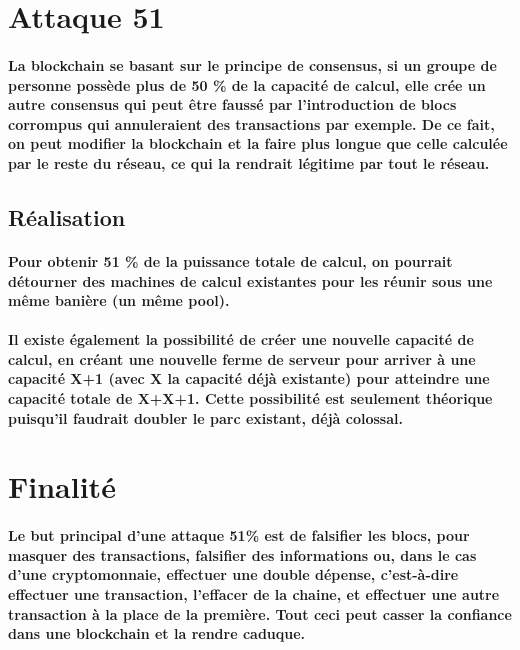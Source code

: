 \documentclass[12pt, a4paper, oneside]{book}
\begin{document}
    \section{Attaque 51}
    \paragraph{La blockchain se basant sur le principe de consensus, si un groupe de personne possède plus de 50 \% de la capacité de calcul, elle crée un autre consensus qui peut être faussé par l'introduction de blocs corrompus qui annuleraient des transactions par exemple. De ce fait, on peut modifier la blockchain et la faire plus longue que celle calculée par le reste du réseau, ce qui la rendrait légitime par tout le réseau.}
    \subsection{Réalisation}
    \paragraph{Pour obtenir 51 \% de la puissance totale de calcul, on pourrait détourner des machines de calcul existantes pour les réunir sous une même banière (un même pool).}
    \paragraph{Il existe également la possibilité de créer une nouvelle capacité de calcul, en créant une nouvelle ferme de serveur pour arriver à une capacité X+1 (avec X la capacité déjà existante) pour atteindre une capacité totale de X+X+1. Cette possibilité est seulement théorique puisqu'il faudrait doubler le parc existant, déjà colossal.}
    \section{Finalité}
    \paragraph{Le but principal d'une attaque 51\% est de falsifier les blocs, pour masquer des transactions, falsifier des informations ou, dans le cas d'une cryptomonnaie, effectuer une double dépense, c'est-à-dire effectuer une transaction, l'effacer de la chaine, et effectuer une autre transaction à la place de la première.
    \newline
    Tout ceci peut casser la confiance dans une blockchain et la rendre caduque.}
\end{document}
